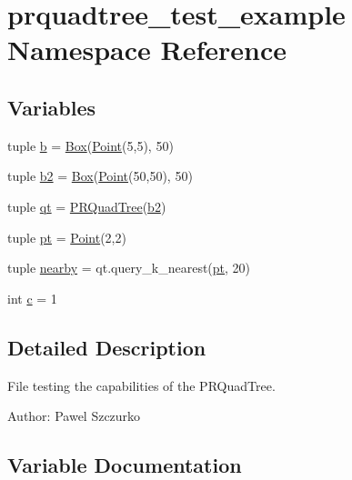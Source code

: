 \section{prquadtree\+\_\+test\+\_\+example Namespace Reference}
\label{namespaceprquadtree__test__example}
\subsection*{Variables}
\begin{DoxyCompactItemize}
\item 
tuple \hyperlink{namespaceprquadtree__test__example_a430c6e4c1960cb0326d40a60be817d65}{b} = \hyperlink{classprquadtree_1_1Box}{Box}(\hyperlink{classprquadtree_1_1Point}{Point}(5,5), 50)
\item 
tuple \hyperlink{namespaceprquadtree__test__example_a6c76891a5f566a70e8ab91c9946be5a2}{b2} = \hyperlink{classprquadtree_1_1Box}{Box}(\hyperlink{classprquadtree_1_1Point}{Point}(50,50), 50)
\item 
tuple \hyperlink{namespaceprquadtree__test__example_a92699a8bb92121b0ffdac66d511f3359}{qt} = \hyperlink{classprquadtree_1_1PRQuadTree}{P\+R\+Quad\+Tree}(\hyperlink{namespaceprquadtree__test__example_a6c76891a5f566a70e8ab91c9946be5a2}{b2})
\item 
tuple \hyperlink{namespaceprquadtree__test__example_ab0091dbc0243fa027e0bc7025d8ea3ad}{pt} = \hyperlink{classprquadtree_1_1Point}{Point}(2,2)
\item 
tuple \hyperlink{namespaceprquadtree__test__example_a2024920106d8770dc2cfa9da1e4fe410}{nearby} = qt.\+query\+\_\+k\+\_\+nearest(\hyperlink{namespaceprquadtree__test__example_ab0091dbc0243fa027e0bc7025d8ea3ad}{pt}, 20)
\item 
int \hyperlink{namespaceprquadtree__test__example_a51f7199631c374c21ed3dada86cc3766}{c} = 1
\end{DoxyCompactItemize}


\subsection{Detailed Description}
\begin{DoxyVerb}File testing the capabilities of the PRQuadTree.

Author: Pawel Szczurko
\end{DoxyVerb}
 

\subsection{Variable Documentation}
